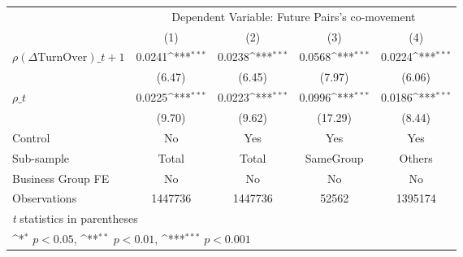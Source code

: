 {
\def\sym#1{\ifmmode^{#1}\else\(^{#1}\)\fi}
\begin{tabular}{l*{4}{c}}
\hline\hline
                &\multicolumn{4}{c}{Dependent Variable: Future Pairs's co-movement}         \\\cmidrule(lr){2-5}
                &\multicolumn{1}{c}{(1)}         &\multicolumn{1}{c}{(2)}         &\multicolumn{1}{c}{(3)}         &\multicolumn{1}{c}{(4)}         \\
\hline
 $ {\rho(\Delta \text{TurnOver})\_{t+1}} $ &   0.0241\sym{***}&   0.0238\sym{***}&   0.0568\sym{***}&   0.0224\sym{***}\\
                &   (6.47)         &   (6.45)         &   (7.97)         &   (6.06)         \\
[1em]
 $ {\rho\_t} $   &   0.0225\sym{***}&   0.0223\sym{***}&   0.0996\sym{***}&   0.0186\sym{***}\\
                &   (9.70)         &   (9.62)         &  (17.29)         &   (8.44)         \\
\hline
Control         &       No         &      Yes         &      Yes         &      Yes         \\
Sub-sample      &    Total         &    Total         &SameGroup         &   Others         \\
Business Group FE&       No         &       No         &       No         &       No         \\
Observations    &  1447736         &  1447736         &    52562         &  1395174         \\
\hline\hline
\multicolumn{5}{l}{\footnotesize \textit{t} statistics in parentheses}\\
\multicolumn{5}{l}{\footnotesize \sym{*} \(p<0.05\), \sym{**} \(p<0.01\), \sym{***} \(p<0.001\)}\\
\end{tabular}
}
